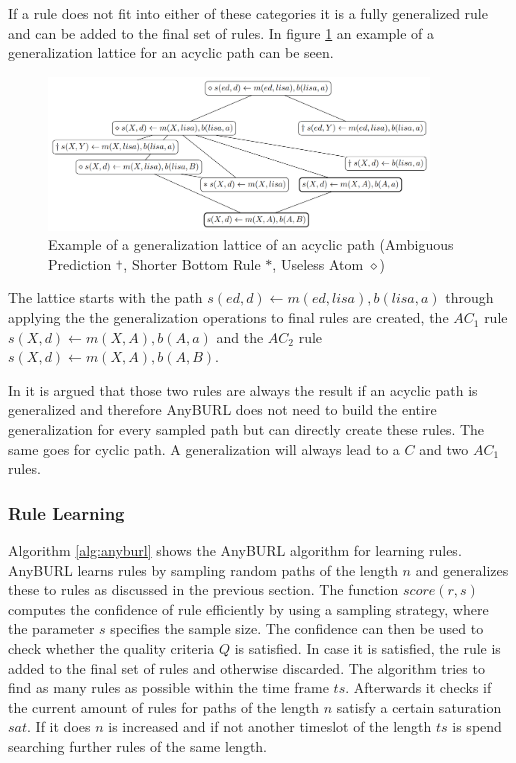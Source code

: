 If a rule does not fit into either of these categories it is a fully generalized rule and can be added to the final set of rules. In figure \ref{fig:generalization_lattice} an example of a generalization lattice for an acyclic path can be seen. \cite{meilicke_reinforced_2020}

\begin{figure}[H]
\centering
\includegraphics[width=0.9\textwidth]{images/example_generalization_lattice.png}
\caption{Example of a generalization lattice of an acyclic path (Ambiguous Prediction $\cross[.4pt]$, Shorter Bottom Rule $\ast$, Useless Atom $\diamond$)}
\label{fig:generalization_lattice}
\end{figure}

The lattice starts with the path $s(ed,d) \leftarrow m(ed,lisa), b(lisa,a)$ through applying the the generalization operations to final rules are created, the $AC_1$ rule $s(X,d) \leftarrow m(X,A),b(A,a)$ and the $AC_2$ rule $s(X,d) \leftarrow m(X,A),b(A,B)$.

In \cite{meilicke_reinforced_2020} it is argued that those two rules are always the result if an acyclic path is generalized and therefore AnyBURL does not need to build the entire generalization for every sampled path but can directly create these rules. The same goes for cyclic path. A generalization will always lead to a $C$ and two $AC_1$ rules.   

\subsubsection{Rule Learning}
\label{cha:anyburl_learning}
Algorithm \ref{alg:anyburl} shows the AnyBURL algorithm for learning rules. AnyBURL learns rules by sampling random paths of the length $n$ and generalizes these to rules as discussed in the previous section. The function $score(r,s)$ computes the confidence of rule efficiently by using a sampling strategy, where the parameter $s$ specifies the sample size. The confidence can then be used to check whether the quality criteria $Q$ is satisfied. In case it is satisfied, the rule is added to the final set of rules and otherwise discarded. The algorithm tries to find as many rules as possible within the time frame $ts$. Afterwards it checks if the current amount of rules for paths of the length $n$ satisfy a certain saturation $sat$. If it does $n$ is increased and if not another timeslot of the length $ts$ is spend searching further rules of the same length. \cite{meilicke_anytime_2019}

